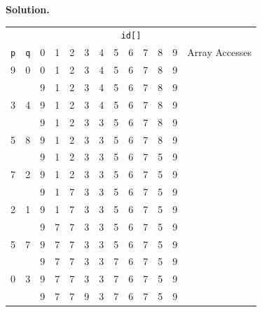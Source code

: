 \documentclass[12pt, a4paper]{article}
\newenvironment{sol}[1][Solution]
{\par\medskip\noindent \textbf{#1.} }
{\medskip}
\begin{document}
	\begin{sol}
		\begin{center}
			\begin{tabular}{cc|cccccccccc|c}
				\multicolumn{13}{c}{\texttt{id[]}}\\
				\texttt{p} & \texttt{q} & 0 & 1 & 2 & 3 & 4 & 5 & 6 & 7 & 8 & 9 & Array Accesses\\
				\hline
				9  & 0  & {\color{green} 0} & 1 & 2 & 3 & 4 & 5 & 6 & 7 & 8 & {\color{green} 9} & {}\\
				{} & {} & {\color{red} 9} & 1 & 2 & 3 & 4 & 5 & 6 & 7 & 8 & 9 & {}\\
				
				3  & 4  & 9 & 1 & 2 & {\color{green} 3} & {\color{green} 4} & 5 & 6 & 7 & 8 & 9 & {}\\
				{} & {} & 9 & 1 & 2 & 3 & {\color{red} 3} & 5 & 6 & 7 & 8 & 9 & {}\\
				
				5  & 8  & 9 & 1 & 2 & 3 & 3 & {\color{green} 5} & 6 & 7 & {\color{green} 8} & 9 & {}\\
				{} & {} & 9 & 1 & 2 & 3 & 3 & 5 & 6 & 7 & {\color{red} 5} & 9 & {}\\
				
				7  & 2 & 9 & 1 & {\color{green} 2} & 3 & 3 & 5 & 6 & {\color{green} 7} & {\color{red} 5} & 9 & {}\\
				{} & {} & 9 & 1 & {\color{red} 7} & 3 & 3 & 5 & 6 & 7 & {\color{red} 5} & 9 & {}\\
				
				2  & 1 & 9 & {\color{green}1} & {\color{green} 7} & 3 & 3 & 5 & 6 & {\color{green} 7} & 5 & 9 & {}\\
				{} & {} & 9 & {\color{red}7} & 7 & 3 & 3 & 5 & 6 & 7 & 5 & 9 & {}\\
				
				5  & 7 & 9 & {\color{green} 7} & {\color{green} 7} & 3 & 3 & {\color{green} 5} & 6 & {\color{green} 7} & {\color{green}5} & 9 & {}\\
				{} & {} & 9 & 7 & 7 & 3 & 3 & {\color{red} 7} & 6 & {\color{green} 7} & 5 & 9 & {}\\
				
				0  & 3  & {\color{green} 9} & 7 & 7 & {\color{green}3} & {\color{green}3} & 7 & 6 & 7 & 5 & {\color{green}9} & {}\\
				{} & {} & 9 & 7 & 7 & {\color{red}9} & 3 & 7 & 6 & 7 & 5 & 9 & {}\\
				

\end{tabular}
\end{center}
\end{sol}
\end{document}
